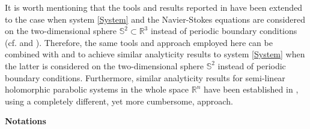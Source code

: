 \documentclass[12pt]{article}
\theoremstyle{plain}
\theoremstyle{remark}
\begin{document}
It is worth mentioning that the tools and results reported in \cite{FerrariTiti1998} have been extended to the case when system \eqref{System} and the Navier-Stokes equations are considered on the two-dimensional sphere $\mathbb{S}^2\subset\mathbb{R}^3$ instead of periodic boundary conditions (cf. \cite{Cao-Rammaha1} and \cite{Cao-Rammaha2}). Therefore, the same tools and approach employed here can be combined with \cite{Cao-Rammaha1} and \cite{Cao-Rammaha2} to achieve similar analyticity results to system \eqref{System} when the latter is  considered on the two-dimensional sphere $\mathbb{S}^2$ instead of periodic boundary conditions. Furthermore, similar analyticity results for semi-linear holomorphic parabolic systems in the whole space $\mathbb{R}^n$ have  been established in \cite{Takac}, using a completely different, yet more cumbersome, approach. 

\vspace{0.5cm}
   
\noindent \textbf{Notations}
\end{document}
